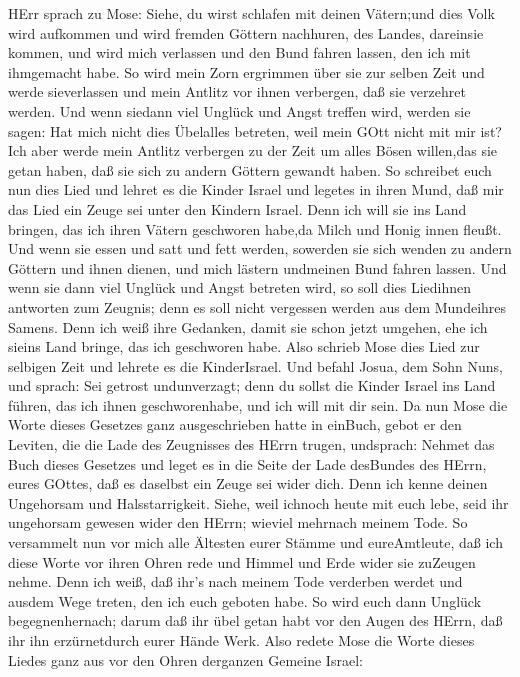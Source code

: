 HErr sprach zu Mose: Siehe, du wirst schlafen mit deinen Vätern;und dies
Volk wird aufkommen und wird fremden Göttern nachhuren, des Landes,
dareinsie kommen, und wird mich verlassen und den Bund fahren lassen,
den ich mit ihmgemacht habe.  So wird mein Zorn ergrimmen
über sie zur selben Zeit und werde sieverlassen und mein Antlitz vor
ihnen verbergen, daß sie verzehret werden. Und wenn siedann viel Unglück
und Angst treffen wird, werden sie sagen: Hat mich nicht dies Übelalles
betreten, weil mein GOtt nicht mit mir ist?  Ich aber werde
mein Antlitz verbergen zu der Zeit um alles Bösen willen,das sie getan
haben, daß sie sich zu andern Göttern gewandt haben.  So
schreibet euch nun dies Lied und lehret es die Kinder Israel und legetes
in ihren Mund, daß mir das Lied ein Zeuge sei unter den Kindern Israel.
 Denn ich will sie ins Land bringen, das ich ihren Vätern
geschworen habe,da Milch und Honig innen fleußt. Und wenn sie essen und
satt und fett werden, sowerden sie sich wenden zu andern Göttern und
ihnen dienen, und mich lästern undmeinen Bund fahren lassen.
 Und wenn sie dann viel Unglück und Angst betreten wird, so
soll dies Liedihnen antworten zum Zeugnis; denn es soll nicht vergessen
werden aus dem Mundeihres Samens. Denn ich weiß ihre Gedanken, damit sie
schon jetzt umgehen, ehe ich sieins Land bringe, das ich geschworen
habe.  Also schrieb Mose dies Lied zur selbigen Zeit und
lehrete es die KinderIsrael.  Und befahl Josua, dem Sohn
Nuns, und sprach: Sei getrost undunverzagt; denn du sollst die Kinder
Israel ins Land führen, das ich ihnen geschworenhabe, und ich will mit
dir sein.  Da nun Mose die Worte dieses Gesetzes ganz
ausgeschrieben hatte in einBuch,  gebot er den Leviten, die
die Lade des Zeugnisses des HErrn trugen, undsprach: 
Nehmet das Buch dieses Gesetzes und leget es in die Seite der Lade
desBundes des HErrn, eures GOttes, daß es daselbst ein Zeuge sei wider
dich.  Denn ich kenne deinen Ungehorsam und
Halsstarrigkeit. Siehe, weil ichnoch heute mit euch lebe, seid ihr
ungehorsam gewesen wider den HErrn; wieviel mehrnach meinem Tode.
 So versammelt nun vor mich alle Ältesten eurer Stämme und
eureAmtleute, daß ich diese Worte vor ihren Ohren rede und Himmel und
Erde wider sie zuZeugen nehme.  Denn ich weiß, daß ihr's
nach meinem Tode verderben werdet und ausdem Wege treten, den ich euch
geboten habe. So wird euch dann Unglück begegnenhernach; darum daß ihr
übel getan habt vor den Augen des HErrn, daß ihr ihn erzürnetdurch eurer
Hände Werk.  Also redete Mose die Worte dieses Liedes ganz
aus vor den Ohren derganzen Gemeine Israel:

